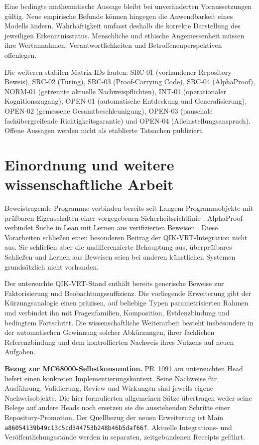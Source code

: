 \documentclass[11pt,a4paper]{article}
\newcommand{\src}{\texttt{a86054139b49c13c5cd344753b248b46b5daf66f}}
\begin{document}
Eine bedingte mathematische Aussage bleibt bei unveränderten Voraussetzungen
gültig. Neue empirische Befunde können hingegen die Anwendbarkeit eines Modells
ändern. Wahrhaftigkeit umfasst deshalb die korrekte Darstellung des jeweiligen
Erkenntnisstatus. Menschliche und ethische Angemessenheit müssen ihre
Wertannahmen, Verantwortlichkeiten und Betroffenenperspektiven offenlegen.

Die weiteren stabilen Matrix-IDs lauten: SRC-01 (vorhandener Repository-Beweis),
SRC-02 (Turing), SRC-03 (Proof-Carrying Code), SRC-04 (AlphaProof), NORM-01
(getrennte aktuelle Nachweispflichten), INT-01 (operationaler Kognitionszugang),
OPEN-01 (automatische Entdeckung und Generalisierung), OPEN-02 (gemessene
Gesamtbeschleunigung), OPEN-03 (pauschale fachübergreifende Richtigkeitsgarantie)
und OPEN-04 (Alleinstellungsanspruch). Offene Aussagen werden nicht als
etablierte Tatsachen publiziert.

\section{Einordnung und weitere wissenschaftliche Arbeit}
Beweistragende Programme verbinden bereits seit Langem Programmobjekte mit
prüfbaren Eigenschaften einer vorgegebenen Sicherheitsrichtlinie
\cite{necula}. AlphaProof verbindet Suche in Lean mit Lernen aus verifizierten
Beweisen \cite{alphaproof}. Diese Vorarbeiten schließen einen besonderen Beitrag
der QIK-VRT-Integration nicht aus. Sie schließen aber die undifferenzierte
Behauptung aus, überprüfbares Schließen und Lernen aus Beweisen seien bei anderen
künstlichen Systemen grundsätzlich nicht vorhanden.

Der untersuchte QIK-VRT-Stand enthält bereits generische Beweise zur
Faktorisierung und Beobachtungssuffizienz. Die vorliegende Erweiterung gibt der
Kürzungsanalogie einen präzisen, auf beliebige Typen parametrisierten Rahmen und
verbindet ihn mit Fragenfamilien, Komposition, Evidenzbindung und bedingtem
Fortschritt. Die wissenschaftliche Weiterarbeit besteht insbesondere in der
automatischen Gewinnung solcher Abkürzungen, ihrer fachlichen Referenzbindung und
dem kontrollierten Nachweis ihres Nutzens auf neuen Aufgaben.

\textbf{Bezug zur MC68000-Selbstkonsumtion.} PR~1091 am untersuchten Head
 liefert einen konkreten
Implementierungskontext. Seine Nachweise für Ausführung, Validierung, Review und
Wirkungen sind jeweils eigene Nachweisobjekte. Die hier formulierten allgemeinen
Sätze übertragen weder seine Belege auf andere Heads noch ersetzen sie die
ausstehenden Schritte einer Repository-Promotion. Der Quellbezug der neuen
Erweiterung ist Main \src. Aktuelle Integrations- und Veröffentlichungsstände
werden in separaten, zeitgebundenen Receipts geführt.
\end{document}
